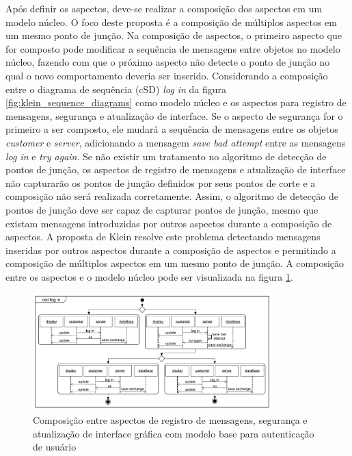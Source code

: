 Após definir os aspectos, deve-se realizar a composição dos aspectos em um modelo núcleo. O foco deste proposta é a composição de múltiplos aspectos
em um mesmo ponto de junção. Na composição de aspectos, o primeiro aspecto que for composto pode modificar a sequência de mensagens entre objetos no
modelo núcleo, fazendo com que o próximo aspecto não detecte o ponto de junção no qual o novo comportamento deveria ser inserido. Considerando a
composição entre o diagrama de sequência (cSD) \textit{log in} da figura \ref{fig:klein_sequence_diagrams} como modelo núcleo e os aspectos para
registro de mensagens, segurança e atualização de interface. Se o aspecto de segurança for o primeiro a ser composto, ele mudará a sequência de
mensagens entre os objetos \textit{customer} e \textit{server}, adicionando a mensagem \textit{save bad attempt} entre as mensagens \textit{log in} e
\textit{try again}. Se não existir um tratamento no algoritmo de detecção de pontos de junção,  os aspectos de registro de mensagens e atualização de
interface não capturarão os pontos de junção definidos por seus pontos de corte e a composição não será realizada corretamente. Assim, o algoritmo de
detecção de pontos de junção deve ser capaz de capturar pontos de junção, mesmo que existam mensagens introduzidas por outros aspectos durante a
composição de aspectos. A proposta de Klein resolve este problema detectando mensagens inseridas por outros aspectos durante a composição
de aspectos e permitindo a composição de múltiplos aspectos em um mesmo ponto de junção. A composição entre os aspectos e o modelo núcleo pode ser
visualizada na figura \ref{fig:klein_composition}.

\begin{figure}
	\centering
	\includegraphics[width=350px]{img/klein_composition.png}
	\caption{Composição entre aspectos de registro de mensagens, segurança e 
	atualização de interface gráfica com modelo
	base para autenticação de usuário}\label{fig:klein_composition}
\end{figure}

